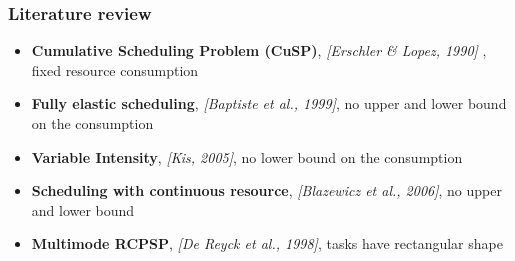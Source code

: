 \begin{frame}
  \frametitle{Literature review}
  \begin{itemize}
    \vfill
  \item {\bf Cumulative Scheduling Problem (CuSP)},
    {\color{gray!50!black!50} \it [Erschler \& Lopez, 1990] }, {\color{blue!80!black!80} fixed resource consumption}
    \vfill
\pause
  \item {\bf Fully elastic scheduling}, {\color{gray!50!black!50} \it [Baptiste et al., 1999]}, {\color{blue!80!black!80} no upper and lower bound on the consumption}
    \vfill
\pause
  \item {\bf Variable Intensity}, {\color{gray!50!black!50} \it [Kis, 2005]}, {\color{blue!80!black!80} no lower bound on the consumption}
    \vfill  
\pause
  \item {\bf Scheduling with continuous resource}, {\color{gray!50!black!50}\it [Blazewicz et al., 2006]}, {\color{blue!80!black!80}  no upper and lower bound}
    \vfill
\pause
  \item {\bf Multimode RCPSP}, {\color{gray!50!black!50}\it [De Reyck
      et al., 1998]},
    {\color{blue!80!black!80} tasks have rectangular shape}
  \end{itemize}
  \vfill
\end{frame}


